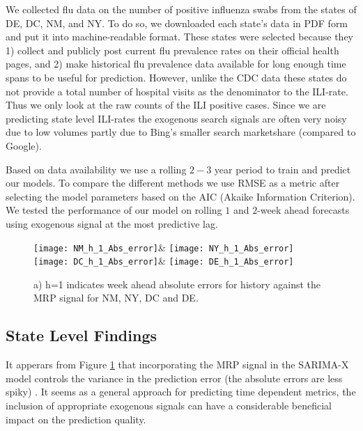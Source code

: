 \documentclass[12pt]{article}
\begin{document}
We collected flu data on the number of positive influenza swabs from the states of DE, DC, NM, and NY. To do so, we downloaded each state's data in PDF form and put it into machine-readable format. These states were selected because they 1) collect and publicly post current flu prevalence rates on their official health pages, and 2) make historical flu prevalence data available for long enough time spans to be useful for prediction. However, unlike the CDC data these states do not provide a total number of hospital visits as the denominator to the ILI-rate. Thus we only look at the raw counts of the ILI positive cases. Since we are predicting state level ILI-rates the exogenous search signals are often very noisy due to low volumes partly due to Bing's smaller search marketshare (compared to Google). 

Based on data availability we use a rolling $2-3$ year period to train and predict our models. To compare the different methods we use RMSE as a metric after selecting the model parameters based on the AIC (Akaike Information Criterion). We tested the performance of our model on rolling $1$ and $2$-week ahead forecasts using exogenous signal at the most predictive lag.
\begin{figure}[h!]
 \centering
 \texttt{[image: NM\_h\_1\_Abs\_error]}&
  \texttt{[image: NY\_h\_1\_Abs\_error]}\\
    \texttt{[image: DC\_h\_1\_Abs\_error]}&
        \texttt{[image: DE\_h\_1\_Abs\_error]}
 \caption{a) h=1 indicates week ahead absolute errors for history against the MRP signal for NM,  NY, DC and DE.}
  \label{fig:State_Abs_Errs}
\end{figure}
\subsection*{State Level Findings}

It apperars from Figure \ref{fig:State_Abs_Errs} that incorporating the MRP signal in the SARIMA-X model controls the variance in the prediction error (the absolute errors are less spiky) . It seems as a general approach for predicting time dependent metrics, the inclusion of appropriate exogenous signals can have a considerable beneficial impact on the prediction quality.


\end{document}
